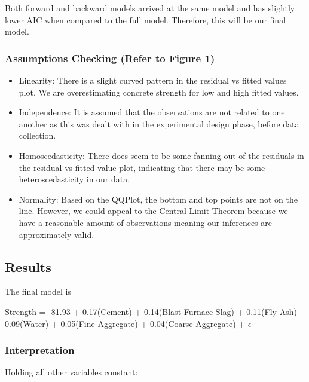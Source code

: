 \documentclass[letterpaper,9pt,twocolumn,twoside,]{pinp}
\providecommand{\tightlist}{%
  \setlength{\itemsep}{0pt}\setlength{\parskip}{0pt}}
\begin{document}
Both forward and backward models arrived at the same model and has
slightly lower AIC when compared to the full model. Therefore, this will
be our final model.

\hypertarget{assumptions-checking-refer-to-figure-1}{%
\subsubsection{Assumptions Checking (Refer to Figure
1)}\label{assumptions-checking-refer-to-figure-1}}

\begin{itemize}
\tightlist
\item
  Linearity: There is a slight curved pattern in the residual vs fitted
  values plot. We are overestimating concrete strength for low and high
  fitted values.
\item
  Independence: It is assumed that the observations are not related to
  one another as this was dealt with in the experimental design phase,
  before data collection.
\item
  Homoscedasticity: There does seem to be some fanning out of the
  residuals in the residual vs fitted value plot, indicating that there
  may be some heteroscedasticity in our data.
\item
  Normality: Based on the QQPlot, the bottom and top points are not on
  the line. However, we could appeal to the Central Limit Theorem
  because we have a reasonable amount of observations meaning our
  inferences are approximately valid.
\end{itemize}

\hypertarget{results}{%
\subsection{Results}\label{results}}

The final model is

Strength = -81.93 + 0.17(Cement) + 0.14(Blast Furnace Slag) + 0.11(Fly
Ash) - 0.09(Water) + 0.05(Fine Aggregate) + 0.04(Coarse Aggregate) +
\(\epsilon\)

\hypertarget{interpretation}{%
\subsubsection{Interpretation}\label{interpretation}}

Holding all other variables constant:
\end{document}
